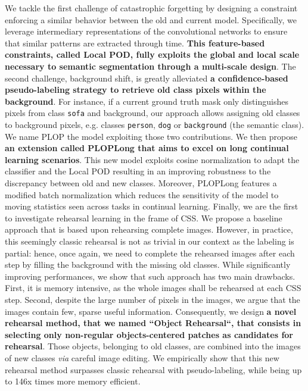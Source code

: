 We tackle the first challenge of catastrophic forgetting by designing a constraint enforcing a
similar behavior between the old and current model. Specifically, we leverage intermediary
representations of the convolutional networks to ensure that similar patterns are extracted through
time. \textbf{This feature-based constraints, called Local POD, fully exploits the global and local
    scale necessary to semantic segmentation through a multi-scale design}. The second challenge,
background shift, is greatly alleviated \textbf{a confidence-based pseudo-labeling strategy to
    retrieve old class pixels within the background}. For instance, if a current ground truth mask only
distinguishes pixels from class \texttt{sofa} and background, our approach allows assigning old
classes to background pixels, e.g. classes \texttt{person}, \texttt{dog} or \texttt{background} (the
semantic class). We name PLOP the model exploiting those two contributions. We then propose
\textbf{an extension called PLOPLong that aims to excel on long continual learning scenarios}. This
new model exploits cosine normalization to adapt the classifier and the Local POD resulting in an
improving robustness to the discrepancy between old and new classes. Moreover, PLOPLong features a
modified batch normalization which reduces the sensitivity of the model to moving statistics seen
across tasks in continual learning. Finally, we are the first to investigate rehearsal learning in
the frame of \ac{CSS}. We propose a baseline approach that is based upon rehearsing complete images.
However, in practice, this seemingly classic rehearsal is not as trivial in our context as the
labeling is partial: hence, once again, we need to complete the rehearsed images after each step by
filling the background with the missing old classes. While significantly improving performances, we
show that such approach has two main drawbacks. First, it is memory intensive, as the whole images
shall be rehearsed at each \ac{CSS} step. Second, despite the large number of pixels in the images,
we argue that the images contain few, sparse useful information. Consequently, we design \textbf{a
    novel rehearsal method, that we named ``Object Rehearsal``, that consists in selecting only
    non-regular objects-centered patches as candidates for rehearsal}. Those objects, belonging to old
classes, are combined into the images of new classes \textit{via} careful image editing. We
empirically show that this new rehearsal method surpasses classic rehearsal with pseudo-labeling,
while being up to 146x times more memory efficient.

